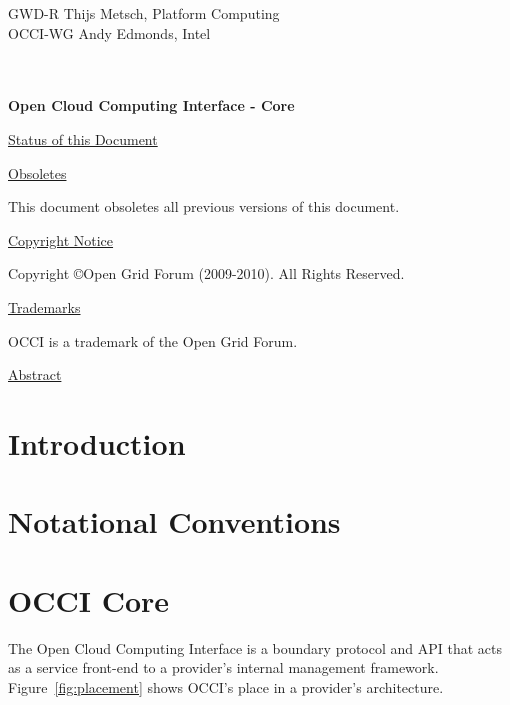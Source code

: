 \documentclass[10pt,a4paper]{article}
\begin{document}
\thispagestyle{empty}

GWD-R \hfill  Thijs Metsch, Platform Computing\\
OCCI-WG \hfill  Andy Edmonds, Intel\\
\\
\\

\vspace*{0.5in}

\begin{Large}
\textbf{Open Cloud Computing Interface - Core}
\end{Large}

\vspace*{0.5in}

\underline{Status of this Document}



\underline{Obsoletes}

This document obsoletes all previous versions of this document.

\underline{Copyright Notice}

Copyright \copyright Open Grid Forum (2009-2010). All Rights Reserved.

\underline{Trademarks}

OCCI is a trademark of the Open Grid Forum.

\underline{Abstract}



\newpage
\tableofcontents
\newpage

\section{Introduction}


\section{Notational Conventions}


\section{OCCI Core}
The Open Cloud Computing Interface is a boundary protocol and API that
acts as a service front-end to a provider's internal management
framework. Figure~\ref{fig:placement} shows OCCI's place in a
provider's architecture.
\end{document}
